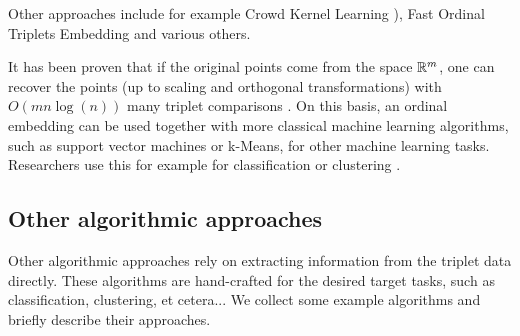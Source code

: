 Other approaches include for example 
Crowd Kernel Learning \citep[CKL,][]{tamuzAdaptivelyLearningCrowd2011}), Fast Ordinal Triplets Embedding \citep[FORTE,][]{jainFiniteSamplePrediction2016} and various others. 

It has been proven that if the original points come from the space $\mathbb{R}^{m}$, one can recover the points (up to scaling and orthogonal transformations) with $O(mn\log(n))$ many triplet comparisons
\citep{jainFiniteSamplePrediction2016}. On this basis, an ordinal embedding can be used together with more classical machine learning algorithms, such as support vector machines or k-Means,
for other machine learning tasks. Researchers use this for example for classification \citep{tamuzAdaptivelyLearningCrowd2011, kleindessnerLensDepthFunction2017} or clustering \citep{kleindessnerLensDepthFunction2017}.

\subsection{Other algorithmic approaches}
Other algorithmic approaches rely on extracting information from the triplet data directly.
These algorithms are hand-crafted for the desired target tasks, such as classification, clustering, et cetera... We collect some example algorithms and briefly describe their approaches.

